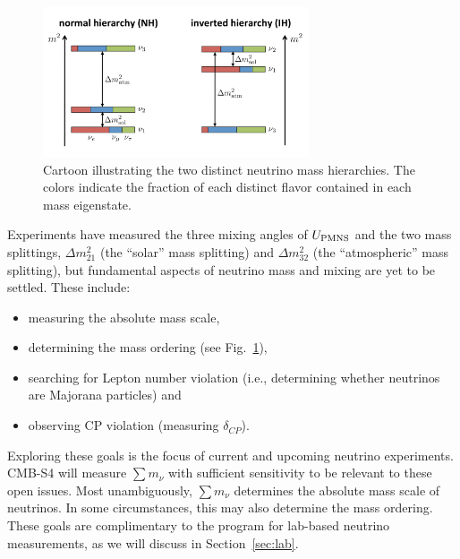 \begin{figure}[h!]
\centering 
\includegraphics[width=0.7\textwidth]{Neutrinos/masscartoon.pdf}
\caption{Cartoon illustrating the two distinct neutrino mass hierarchies. The colors indicate the fraction of each distinct flavor contained in each mass eigenstate.}
\label{fig:NeutrinoMixHierarch}
\end{figure}

Experiments have measured the three mixing angles of $U_{\rm PMNS}$ and the two mass splittings, $\Delta m^2_{21}$ (the ``solar'' mass splitting) and $\Delta m^2_{32}$ (the ``atmospheric'' mass splitting), but fundamental aspects of neutrino mass and mixing are yet to be settled. These include:
\begin{itemize}
\item measuring the absolute mass scale,
\item determining the mass ordering (see Fig.~\ref{fig:NeutrinoMixHierarch}),
\item searching for Lepton number violation (i.e., determining whether neutrinos are Majorana particles) and
\item observing CP violation (measuring $\delta_{CP}$).
\end{itemize}
Exploring these goals is the focus of current and upcoming neutrino experiments. CMB-S4 will measure $ \sum m_\nu $ with sufficient sensitivity to be relevant to these open issues.  Most unambiguously, $\sum m_\nu$ determines  the absolute mass scale of neutrinos.  In some circumstances, this may also determine the mass ordering.  These goals are complimentary to the program for lab-based neutrino measurements, as we will discuss in Section~\ref{sec:lab}.



